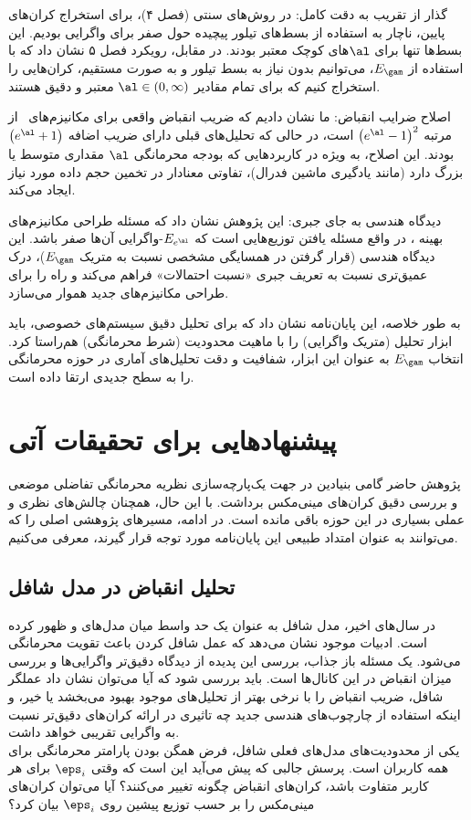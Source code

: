گذار از تقریب به دقت کامل: در روش‌های سنتی (فصل ۴)، برای استخراج کران‌های پایین، ناچار به استفاده از بسط‌های تیلور پیچیده حول صفر برای واگرایی  بودیم. این بسط‌ها تنها برای $\al$های کوچک معتبر بودند. در مقابل، رویکرد فصل ۵ نشان داد که با استفاده از $E_\gam$، می‌توانیم بدون نیاز به بسط تیلور و به صورت مستقیم، کران‌هایی را استخراج کنیم که برای تمام مقادیر $\al \in (0, \infty)$ معتبر و دقیق هستند.

اصلاح ضرایب انقباض: ما نشان دادیم که ضریب انقباض واقعی برای مکانیزم‌های \LDP\ از مرتبه $\left(e^\al - 1\right)^2$ است، در حالی که تحلیل‌های قبلی دارای ضریب اضافه $\left(e^\al + 1\right)$ بودند. این اصلاح، به ویژه در کاربردهایی که بودجه محرمانگی $\al$ مقداری متوسط یا بزرگ دارد (مانند یادگیری ماشین فدرال)، تفاوتی معنادار در تخمین حجم داده مورد نیاز ایجاد می‌کند.

دیدگاه هندسی به جای جبری: این پژوهش نشان داد که مسئله طراحی مکانیزم‌های بهینه \LDP، در واقع مسئله یافتن توزیع‌هایی است که $E_{e^\al}$-واگرایی آن‌ها صفر باشد. این دیدگاه هندسی (قرار گرفتن در همسایگی مشخصی نسبت به متریک $E_\gam$)، درک عمیق‌تری نسبت به تعریف جبری «نسبت احتمالات» فراهم می‌کند و راه را برای طراحی مکانیزم‌های جدید هموار می‌سازد.

به طور خلاصه، این پایان‌نامه نشان داد که برای تحلیل دقیق سیستم‌های خصوصی، باید ابزار تحلیل (متریک واگرایی) را با ماهیت محدودیت (شرط محرمانگی) هم‌راستا کرد. انتخاب $E_\gam$ به عنوان این ابزار، شفافیت و دقت تحلیل‌های آماری در حوزه محرمانگی را به سطح جدیدی ارتقا داده است.


\section{پیشنهادهایی برای تحقیقات آتی}
\label{sec:future-works}

پژوهش حاضر گامی بنیادین در جهت یک‌پارچه‌سازی نظریه محرمانگی تفاضلی موضعی و بررسی دقیق کران‌های مینی‌مکس برداشت. با این حال، همچنان چالش‌های نظری و عملی بسیاری در این حوزه باقی مانده است. در ادامه، مسیرهای پژوهشی اصلی را که می‌توانند به عنوان امتداد طبیعی این پایان‌نامه مورد توجه قرار گیرند، معرفی می‌کنیم.

\subsection{تحلیل انقباض در مدل شافل}
در سال‌های اخیر، مدل شافل به عنوان یک حد واسط میان مدل‌های  و  ظهور کرده است. ادبیات موجود نشان می‌دهد که عمل شافل کردن باعث تقویت محرمانگی می‌شود. یک مسئله باز جذاب، بررسی این پدیده از دیدگاه دقیق‌تر واگرایی‌ها و بررسی میزان انقباض در این کانال‌ها است. باید بررسی شود که آیا می‌توان نشان داد عملگر شافل، ضریب انقباض را با نرخی بهتر از تحلیل‌های موجود بهبود می‌بخشد یا خیر، و اینکه استفاده از چارچوب‌های هندسی جدید چه تاثیری در ارائه کران‌های دقیق‌تر نسبت به واگرایی تقریبی  خواهد داشت.
\\
یکی از محدودیت‌های مدل‌های فعلی شافل، فرض همگن بودن پارامتر محرمانگی برای همه کاربران است. پرسش جالبی که پیش می‌آید این است که وقتی $\eps_i$
 برای هر کاربر متفاوت باشد، کران‌های انقباض چگونه تغییر می‌کنند؟ آیا می‌توان کران‌های مینی‌مکس را بر حسب توزیع پیشین روی $\eps_i$ بیان کرد؟

